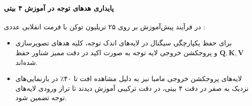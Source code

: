 \paragraph*{پایداری هدهای توجه در آموزش ۴ بیتی }
در فرآیند پیش‌آموزش بر روی ۲۵ تریلیون توکن با فرمت انقلابی عددی :
\begin{itemize}
    \item برای حفظ یکپارچگی سیگنال در لایه‌های اندک توجه، کلیه هدهای تصویرسازی $\mathbf{Q}, \mathbf{K}, \mathbf{V}$ و پروجکشن خروجی لایه توجه به صورت اکید در دقت ممیز شناور  حفظ شده‌اند.
    \item لایه‌های پروجکشن خروجی مامبا نیز به دلیل مشاهده افت تا ۴۰٪ در بازنمایی‌های نزدیک به صفر در دقت ۴ بیتی، در دقت ترکیبی  آموزش دیدند تا تراز ورودی لایه‌های توجه تضمین شود.
\end{itemize}